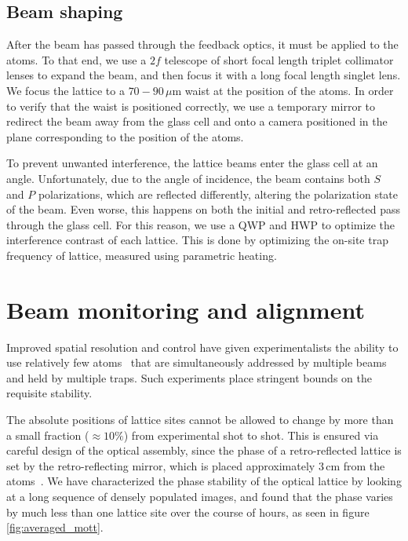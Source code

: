 \documentclass[twocolumn,aps,pra,showpacs,preprintnumbers,bibnotes]{revtex4-1}
\begin{document}
\subsection{Beam shaping}
After the beam has passed through the feedback optics, it must be applied to the atoms. To that end, we use a $2f$ telescope of short focal length triplet collimator lenses to expand the beam, and then focus it with a long focal length singlet lens.
We focus the lattice to a $70-90$\,$\mu$m waist at the position of the atoms.
In order to verify that the waist is positioned correctly, we use a temporary mirror to redirect the beam away from the glass cell and onto a camera positioned in the plane corresponding to the position of the atoms.

To prevent unwanted interference, the lattice beams enter the glass cell at an angle. 
Unfortunately, due to the angle of incidence, the beam contains both $S$ and $P$ polarizations, which are reflected differently, altering the polarization state of the beam.
Even worse, this happens on both the initial and retro-reflected pass through the glass cell.
For this reason, we use a QWP and HWP to optimize the interference contrast of each lattice.
This is done by optimizing the on-site trap frequency of lattice, measured using parametric heating.

\section{Beam monitoring and alignment}
Improved spatial resolution and control have given experimentalists the ability to use relatively few atoms~\cite{Preiss2015, Choi2016, Mazurenko2016} that are simultaneously addressed by multiple beams and held by multiple traps.
Such experiments place stringent bounds on the requisite stability. 

The absolute positions of lattice sites cannot be allowed to change by more than a small fraction ($\approx 10\%$) from experimental shot to shot.
This is ensured via careful design of the optical assembly, since the phase of a retro-reflected lattice is set by the retro-reflecting mirror, which is placed approximately $3\,$cm from the atoms~\cite{Huber2014}. 
We have characterized the phase stability of the optical lattice by looking at a long sequence of densely populated images, and found that the phase varies by much less than one lattice site over the course of hours, as seen in figure \ref{fig:averaged_mott}.
\end{document}
